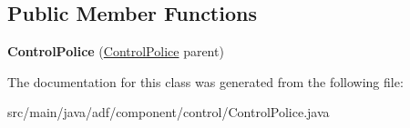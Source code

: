 \subsection*{Public Member Functions}
\begin{DoxyCompactItemize}
\item 
\hypertarget{classadf_1_1component_1_1control_1_1ControlPolice_a5f749280b92a7b6785bf6207f91834f8}{}\label{classadf_1_1component_1_1control_1_1ControlPolice_a5f749280b92a7b6785bf6207f91834f8} 
{\bfseries Control\+Police} (\hyperlink{classadf_1_1component_1_1control_1_1ControlPolice}{Control\+Police} parent)
\end{DoxyCompactItemize}


The documentation for this class was generated from the following file\+:\begin{DoxyCompactItemize}
\item 
src/main/java/adf/component/control/Control\+Police.\+java\end{DoxyCompactItemize}
